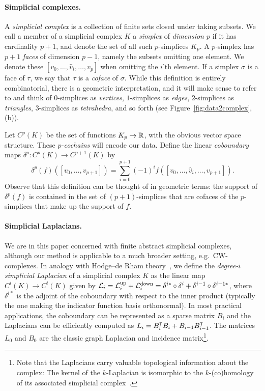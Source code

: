 \paragraph{Simplicial complexes.} 
A \emph{simplicial complex} is a collection of finite sets closed under taking subsets.
We call a member of a simplicial complex $K$ a \emph{simplex} of \emph{dimension $p$} if it has cardinality $p+1$, and denote the set of all such $p$-simplices $K_p$.
A $p$-simplex has $p+1$ \emph{faces} of dimension $p-1$, namely the subsets omitting one element. We denote these $[v_0,\dotsc,\hat{v}_i,\dotsc, v_p]$ when omitting the $i$'th element.
If a simplex $\sigma$ is a face of $\tau$, we say that $\tau$ is a \emph{coface} of $\sigma$. While this definition is entirely combinatorial, there is a geometric interpretation, and it will make sense to refer to and think of $0$-simplices as \emph{vertices}, $1$-simplices as \emph{edges}, $2$-simplices as \emph{triangles}, $3$-simplices as \emph{tetrahedra}, and so forth (see Figure~\ref{fig:data2complex}, (b)).

Let $C^p(K)$ be the set of functions $K_p\to\mathbb{R}$, with the obvious vector space structure. These \emph{$p$-cochains} will encode our data. Define the linear \emph{coboundary} maps $\delta^p:C^p(K)\to C^{p+1}(K)$ by
\begin{equation*}
\delta^p(f)([v_0,\dotsc,v_{p+1}]) = \sum_{i=0}^{p+1} (-1)^i f([v_0,\dotsc,\hat{v}_i,\dotsc,v_{p+1}]).
\end{equation*}
Observe that this definition can be thought of in geometric terms: the support of $\delta^p(f)$ is contained in the set of $(p+1)$-simplices that are cofaces of the $p$-simplices that make up the support of $f$.

\paragraph{Simplicial Laplacians.}
We are in this paper concerned with finite abstract simplicial complexes, although our method is applicable to a much broader setting, e.g.\ CW-complexes. In analogy with Hodge--de Rham theory~\cite{madsen1997calculus}, we define the \emph{degree-$i$ simplicial Laplacian} of a simplicial complex $K$ as the linear map $C^i(K)\to C^i(K)$ given by $\mathcal{L}_i = \mathcal{L}^{\text{up}}_i + \mathcal{L}^{\text{down}}_i = \delta^{i\ast}\circ\delta^{i} + \delta^{i-1}\circ\delta^{i-1\ast}$, where $\delta^{i\ast}$ is the adjoint of the coboundary with respect to the inner product (typically the one making the indicator function basis orthonormal). In most practical applications, the coboundary can be represented as a sparse matrix $B_i$ and the Laplacians can be efficiently computed as $L_i=B_i^{\intercal} B_{i}+B_{i-1}B_{i-1}^{\intercal}$. The matrices $L_0$ and $B_0$ are the classic graph Laplacian and incidence matrix\footnote{Note that the Laplacians carry valuable topological information about the complex: The kernel of the $k$-Laplacian is isomorphic to the $k$-(co)homology of its associated simplicial complex~\cite{eckmann1944,horak2013spectra}.}.

